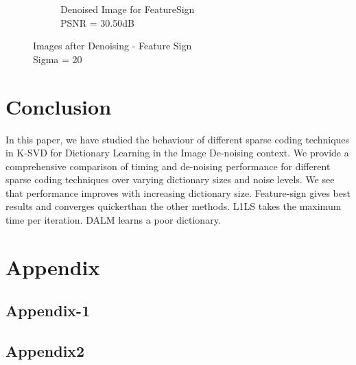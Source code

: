 \documentclass{article} %
\begin{document}
\begin{figure}[h]
\begin{subfigure}[b]{0.5\textwidth}
                \caption{Denoised Image for FeatureSign\\PSNR = 30.50dB}
                \label{fig:DenoisedFeatureSign}
        \end{subfigure}
        \caption{Images after Denoising - Feature Sign\\Sigma = 20}\label{fig:DenoiseFeatureSign}
\end{figure}

\vspace{.2cm}
\section{Conclusion}
\vspace{.2cm}
In this paper, we have studied the behaviour of different sparse coding techniques in K-SVD for Dictionary Learning in the Image De-noising context. We provide a comprehensive comparison of timing and de-noising performance for different sparse coding techniques over varying dictionary sizes and noise levels. We see that performance improves with increasing dictionary size. Feature-sign gives best results and converges quickerthan the other methods. L1LS takes the maximum time per iteration. DALM learns a poor dictionary.


\nocite{*}



\newpage
\section{Appendix}


\subsection{Appendix-1}
\label{sec:Appendix1}
 

\subsection{Appendix2}
\label{Appendix2}
\end{document}
